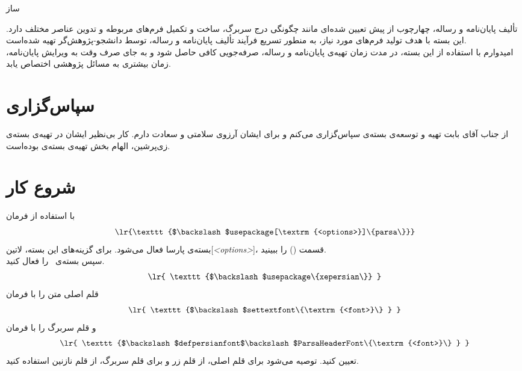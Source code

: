 \documentclass[12pt,a4paper,twoside,fleqn,notitlepage,openany]{extbook}
\begin{document}
\pagestyle{plain}
‌ساز
\begin{center}
\begin{minipage}{0.67\textwidth}
تألیف پایان‌نامه و رساله، چهارچوب از پیش تعیین شده‌ای مانند چگونگی درج سربرگ، ساخت و تکمیل فرم‌های مربوطه و تدوین عناصر مختلف دارد\@. این بسته با هدف تولید فرم‌های مورد نیاز، به منطور تسریع فرآیند تألیف پایان‌نامه و رساله، توسط دانشجو-پژوهش‌گر تهیه شده‌است\@. \\
امیدوارم با استفاده از این بسته، در مدت زمان تهیه‌ی پایان‌نامه و رساله، صرفه‌جویی کافی حاصل شود و به جای صرف وقت به ویرایش پایان‌نامه، زمان بیشتری به مسائل پژوهشی اختصاص یابد\@.
\end{minipage}
\end{center}
\section*{سپاس‌گزاری}
از جناب آقای  بابت تهیه و توسعه‌ی بسته‌ی  سپاس‌گزاری می‌کنم و برای ایشان آرزوی سلامتی و سعادت دارم\@. کار بی‌نظیر ایشان در تهیه‌ی بسته‌ی زی‌پرشین، الهام بخش تهیه‌ی بسته‌ی  بوده‌است.

\section{شروع کار}
با استفاده از فرمان
\[\textrm{\lr{\texttt{$\backslash$usepackage[\textrm{<options>}]\{parsa\}}}}\]
بسته‌ی پارسا فعال می‌شود\@. برای گزینه‌های این بسته، ‌لاتین{[\emph{<options>}]}، قسمت () را ببینید.\\
سپس بسته‌ی \XePersian ~را فعال کنید\@.
\[ \textrm{ \lr{ \texttt{$\backslash$usepackage\{xepersian\}} } } \]
قلم اصلی متن را با فرمان
\[ \textrm{ \lr{ \texttt{$\backslash$settextfont\{\textrm{<font>}\} } } } \]
و قلم سربرگ را با فرمان
\[ \textrm{ \lr{ \texttt{$\backslash$defpersianfont$\backslash$ParsaHeaderFont\{\textrm{<font>}\} } } } \]
تعیین کنید\@. توصیه می‌شود برای قلم اصلی، از قلم زر  و برای قلم سربرگ، از قلم نازنین  استفاده کنید\@.
\end{document}
